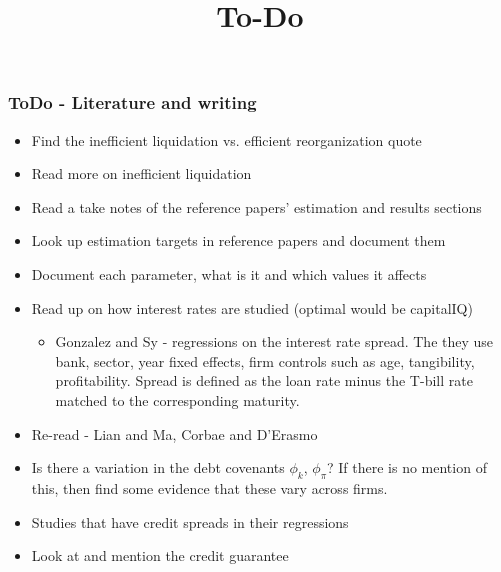 \documentclass[12pt]{article}
\title{To-Do}
\date{}
\begin{document}
\subsubsection*{ToDo - Literature and writing}
\begin{itemize}\setlength\itemsep{0em} \small
    \item Find the inefficient liquidation vs. efficient reorganization quote \checkmark 
    \item Read more on inefficient liquidation \checkmark
    \item Read a take notes of the reference papers' estimation and results sections \checkmark
    \item Look up estimation targets in reference papers and document them \checkmark
    \item Document each parameter, what is it and which values it affects \checkmark
    \item Read up on how interest rates are studied (optimal would be capitalIQ) \checkmark
    \begin{itemize}
        \item Gonzalez and Sy - regressions on the interest rate spread. The they use bank, sector, year fixed effects, firm controls such as age, tangibility, profitability. Spread is defined as the loan rate minus the T-bill rate matched to the corresponding maturity. 
    \end{itemize}
    \item Re-read - Lian and Ma, Corbae and D'Erasmo \checkmark
    \item Is there a variation in the debt covenants $\phi_k$, $\phi_\pi$? If there is no mention of this, then find some evidence that these vary across firms. 
    \item Studies that have credit spreads in their regressions
    \item Look at and mention the credit guarantee 
\end{itemize} \normalsize

\newpage
\end{document}
